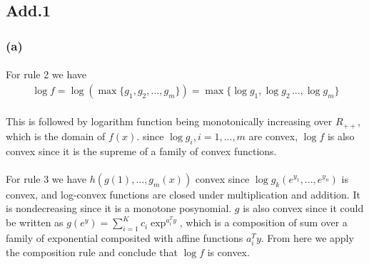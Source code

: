 \subsection*{Add.1}
\subsubsection*{(a)}
\paragraph{}
For rule 2 we have
\begin{align*}
\log f =\log (\max\{g_1, g_2,...,g_m\}) = \max\{\log g_1, \log g_2\,...,\log g_m\}
\end{align*}
\paragraph{}
This is followed by logarithm function being monotonically increasing over $R_{++}$, which is the domain of $f(x)$. since $\log g_i, i=1,...,m$ are convex, $\log f$ is also convex since it is the supreme of a family of convex functions.
\paragraph{}
For rule 3 we have $h(g(1),...,g_m(x))$ convex since $\log g_k(e^{y_1},...,e^{y_n})$ is convex, and log-convex functions are closed under multiplication and addition. It is nondecreasing since it is a monotone posynomial. $g$ is also convex since it could be written as $g(e^y) = \sum_{i =1}^{K} c_i\exp^{a_i^Ty}$, which is a composition of sum over a family of exponential composited with affine functions $a_i^Ty$. From here we apply the composition rule and conclude that $\log f $ is convex.
